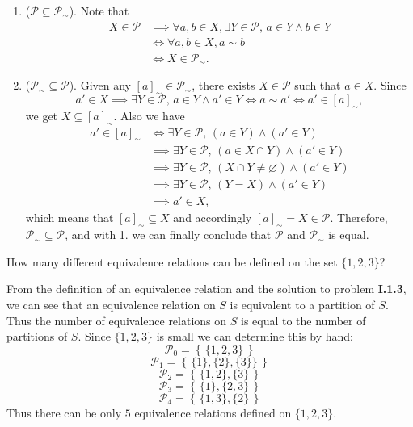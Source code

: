 \documentclass[12pt,letterpaper,boxed]{hmcpset}
\newcommand{\set}[1]{\left\{\,#1\,\right\}}
\begin{document}
\begin{solution}
	\begin{enumerate}
		\item ($\mathscr{P}\subseteq\mathscr{P}_{\sim}$). Note that
		\begin{align*}
			X\in\mathscr{P}&\implies\forall a,b\in X,\exists Y\in\mathscr{P},\,a\in Y \land b\in Y\\
			&\iff\forall a,b\in X,a\sim b\\			
			&\iff X\in\mathscr{P}_{\sim}.
		\end{align*}
		\item ($\mathscr{P}_{\sim}\subseteq\mathscr{P}$). Given any $\left[a\right]_{\sim}\in\mathscr{P}_{\sim}$, there exists $X\in\mathscr{P}$ such that $a\in X$. Since 
		\[
		a'\in X\implies\exists Y\in\mathscr{P},\,a\in Y \land a'\in Y\iff a\sim a'\iff a'\in \left[a\right]_{\sim},
		\]
		we get $X\subseteq \left[a\right]_{\sim}$. Also we have 
		\begin{align*}
		a'\in \left[a\right]_{\sim}&\iff \exists Y\in\mathscr{P},\,(a\in Y) \land (a'\in Y)\\
		&\implies \exists Y\in\mathscr{P},\,(a\in X\cap Y) \land(a'\in Y)\\
		&\implies \exists Y\in\mathscr{P},\, (X\cap Y\ne\varnothing)\land (a'\in Y)\\
		&\implies \exists Y\in\mathscr{P},\, (Y=X)\land (a'\in Y)\\
		&\implies 	a'\in X,
		\end{align*}
		which means that $\left[a\right]_{\sim}\subseteq X$ and accordingly $\left[a\right]_{\sim}=X\in\mathscr{P}$. Therefore,
		$\mathscr{P}_{\sim}\subseteq\mathscr{P}$, and with 1. we can finally conclude that $\mathscr{P}$ and $\mathscr{P}_{\sim}$ is equal.
	\end{enumerate}
\end{solution}


\begin{problem}[1.4]
	How many different equivalence relations can be defined on the set $\{1,2,3\}?$
\end{problem}

\begin{solution}
	From the definition of an equivalence relation and the solution to problem
	\textbf{I.1.3}, we can see that an equivalence relation on $S$ is equivalent to
	a partition of $S$. Thus the number of equivalence relations on $S$ is equal to
	the number of partitions of $S$. Since $\{1,2,3\}$ is small we can determine
	this by hand:
	\[ \mathscr{P}_0 = \set{\{1,2,3\}} \]
	\[ \mathscr{P}_1 = \set{\{1\},\{2\},\{3\}\}} \]
	\[ \mathscr{P}_2 = \set{\{1,2\},\{3\}} \]
	\[ \mathscr{P}_3 = \set{\{1\},\{2,3\}} \]
	\[ \mathscr{P}_4 = \set{\{1,3\},\{2\}} \]
	Thus there can be only $5$ equivalence relations defined on $\{1,2,3\}$.
\end{solution}
\end{document}
